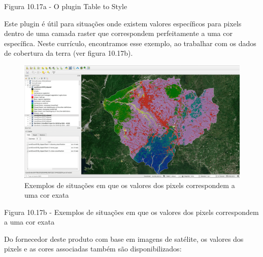 \documentclass[
]{krantz}
\begin{document}
Figura 10.17a - O plugin Table to Style

Este plugin é útil para situações onde existem valores específicos para pixels dentro de uma camada raster que correspondem perfeitamente a uma cor específica. Neste currículo, encontramos esse exemplo, ao trabalhar com os dados de cobertura da terra (ver figura 10.17b).

\begin{figure}
\centering
\includegraphics{media/modulo10/fig1017_b.png}
\caption{Exemplos de situações em que os valores dos pixels correspondem a uma cor exata}
\end{figure}

Figura 10.17b - Exemplos de situações em que os valores dos pixels correspondem a uma cor exata

Do fornecedor deste produto com base em imagens de satélite, os valores dos pixels e as cores associadas também são disponibilizados:
\end{document}
